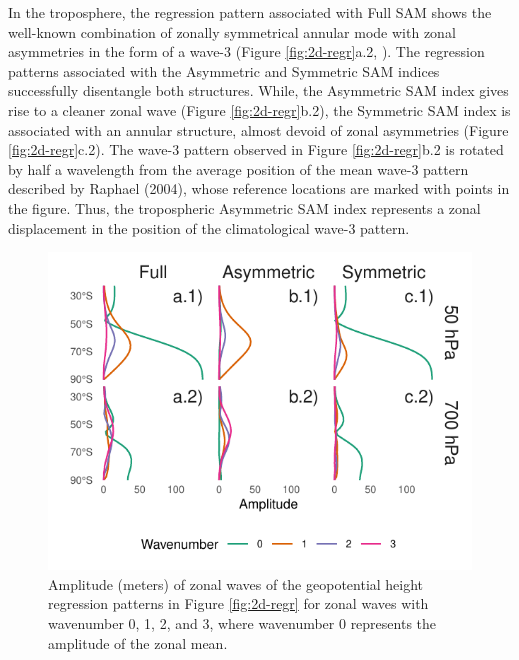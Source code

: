 \documentclass[smallextended]{svjour3}       %
\begin{document}
In the troposphere, the regression pattern associated with Full SAM shows the well-known combination of zonally symmetrical annular mode with zonal asymmetries in the form of a wave-3 (Figure \ref{fig:2d-regr}a.2, \citep{fogt2012}). The regression patterns associated with the Asymmetric and Symmetric SAM indices successfully disentangle both structures. While, the Asymmetric SAM index gives rise to a cleaner zonal wave (Figure \ref{fig:2d-regr}b.2), the Symmetric SAM index is associated with an annular structure, almost devoid of zonal asymmetries (Figure \ref{fig:2d-regr}c.2). The wave-3 pattern observed in Figure \ref{fig:2d-regr}b.2 is rotated by half a wavelength from the average position of the mean wave-3 pattern described by Raphael (2004), whose reference locations are marked with points in the figure. Thus, the tropospheric Asymmetric SAM index represents a zonal displacement in the position of the climatological wave-3 pattern.



\begin{figure}
\includegraphics{wave-amplitude-1} \caption{Amplitude (meters) of zonal waves of the geopotential height regression patterns in Figure \ref{fig:2d-regr} for zonal waves with wavenumber 0, 1, 2, and 3, where wavenumber 0 represents the amplitude of the zonal mean.}\label{fig:wave-amplitude}
\end{figure}
\end{document}
